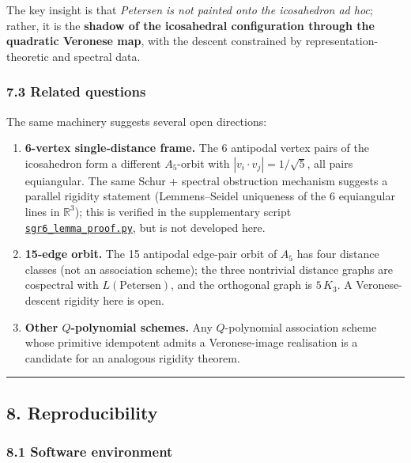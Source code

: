 \documentclass[
]{article}
\begin{document}
The key insight is that \emph{Petersen is not painted onto the
icosahedron ad hoc}; rather, it is the \textbf{shadow of the icosahedral
configuration through the quadratic Veronese map}, with the descent
constrained by representation-theoretic and spectral data.

\subsubsection{7.3 Related questions}\label{related-questions}

The same machinery suggests several open directions:

\begin{enumerate}
\def\labelenumi{\arabic{enumi}.}
\item
  \textbf{6-vertex single-distance frame.} The 6 antipodal vertex pairs
  of the icosahedron form a different \(A_5\)-orbit with
  \(|v_i\cdot v_j| =
  1/\sqrt{5}\), all pairs equiangular. The same Schur + spectral
  obstruction mechanism suggests a parallel rigidity statement
  (Lemmens--Seidel uniqueness of the 6 equiangular lines in
  \(\mathbb{R}^3\)); this is verified in the supplementary script
  \href{../scripts/sgr6_lemma_proof.py}{\texttt{sgr6\_lemma\_proof.py}},
  but is not developed here.
\item
  \textbf{15-edge orbit.} The 15 antipodal edge-pair orbit of \(A_5\)
  has four distance classes (not an association scheme); the three
  nontrivial distance graphs are cospectral with \(L(\text{Petersen})\),
  and the orthogonal graph is \(5\,K_3\). A Veronese-descent rigidity
  here is open.
\item
  \textbf{Other \(Q\)-polynomial schemes.} Any \(Q\)-polynomial
  association scheme whose primitive idempotent admits a Veronese-image
  realisation is a candidate for an analogous rigidity theorem.
\end{enumerate}

\begin{center}\rule{0.5\linewidth}{0.5pt}\end{center}

\subsection{8. Reproducibility}\label{reproducibility}

\subsubsection{8.1 Software environment}\label{software-environment}
\end{document}
